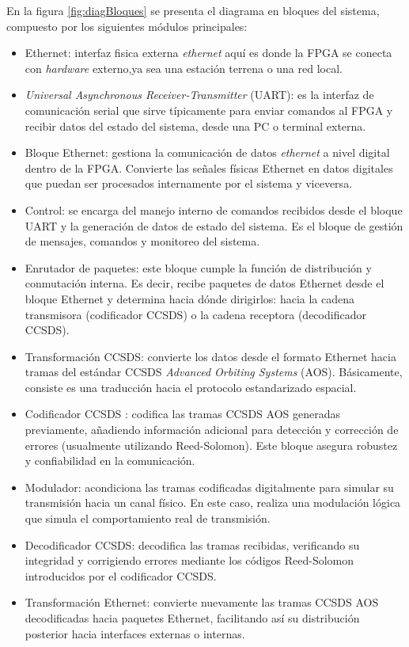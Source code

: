\documentclass[
11pt, %
]{charter}
\begin{document}
En la figura \ref{fig:diagBloques} se presenta el diagrama en bloques del sistema, compuesto por los siguientes módulos principales:
\begin{itemize}
	\item Ethernet: interfaz fisica externa \textit{ethernet} aquí es donde la FPGA se conecta con \textit{hardware} externo,ya sea una estación terrena o una red local.
	\item \textit{Universal Asynchronous Receiver-Transmitter} (UART): es la interfaz de comunicación serial que sirve típicamente para enviar comandos al FPGA y recibir datos del estado del sistema, desde una PC o terminal externa.
	\item Bloque Ethernet: gestiona la comunicación de datos \textit{ethernet} a nivel digital dentro de la FPGA. Convierte las señales físicas Ethernet en datos digitales que puedan ser procesados internamente por el sistema y viceversa.
	\item Control: se encarga del manejo interno de comandos recibidos desde el bloque UART y la generación de datos de estado del sistema. Es el bloque de gestión de mensajes, comandos y monitoreo del sistema. 
	\item Enrutador de paquetes: este bloque cumple la función de distribución y conmutación interna. Es decir, recibe paquetes de datos Ethernet desde el bloque Ethernet y determina hacia dónde dirigirlos: hacia la cadena transmisora (codificador CCSDS) o la cadena receptora (decodificador CCSDS).
	\item Transformación CCSDS: convierte los datos desde el formato Ethernet hacia tramas del estándar CCSDS \textit{Advanced Orbiting Systems} (AOS). Básicamente, consiste es una traducción hacia el protocolo estandarizado espacial.
	\item Codificador CCSDS : codifica las tramas CCSDS AOS generadas previamente, añadiendo información adicional para detección y corrección de errores (usualmente utilizando Reed-Solomon). Este bloque asegura robustez y confiabilidad en la comunicación.
	\item Modulador: acondiciona las tramas codificadas digitalmente para simular su transmisión hacia un canal físico. En este caso, realiza una modulación lógica que simula el comportamiento real de transmisión.
	\item Decodificador CCSDS: decodifica las tramas recibidas, verificando su integridad y corrigiendo errores mediante los códigos Reed-Solomon introducidos por el codificador CCSDS.
	\item Transformación Ethernet: convierte nuevamente las tramas CCSDS AOS decodificadas hacia paquetes Ethernet, facilitando así su distribución posterior hacia interfaces externas o internas.
\end{itemize}
\end{document}
